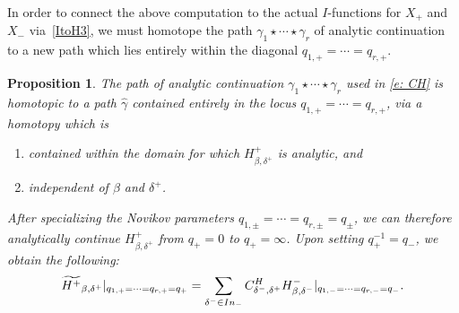 \documentclass[11pt]{article}
\numberwithin{equation}{section}
\newtheorem{Proposition}[Theorem]{Proposition}
 { \theoremstyle{definition}
\newtheorem{Definition}[Theorem]{Definition}
\newtheorem{Note}[Theorem]{Note}
\newtheorem{Example}[Theorem]{Example}
\newtheorem{Remark}[Theorem]{Remark} }
\numberwithin{equation}{section}
\begin{document}
In order to connect the above computation to the actual $I$-functions for $X_+$ and $X_-$ via~\eqref{ItoH3}, we must homotope the path $\gamma_1 \star \cdots \star \gamma_r$ of analytic continuation to a new path which lies entirely within the diagonal $q_{1, +} = \cdots =q_{r, +}$.
\begin{Proposition}\label{p:ancon}
The path of analytic continuation $\gamma_1 \star \cdots \star \gamma_r$ used in \eqref{e: CH} is homotopic to a path $\hat \gamma$ contained entirely in the locus $q_{1, +} = \cdots = q_{r, +}$, via a homotopy which is
\begin{enumerate}\itemsep=0pt
\item[$1)$] contained within the domain for which ${H^{+}_{\beta, \delta^+}}$ is analytic, and
\item[$2)$] independent of $\beta$ and $\delta^+$.
\end{enumerate}
After specializing the Novikov parameters $q_{1, \pm} = \cdots = q_{r, \pm} = q_\pm$, we can therefore analytically continue $H^{+}_{\beta, \delta^+}$ from $q_+ = 0$ to $q_+ = \infty$. Upon setting $q_+^{-1} = q_-$, we obtain the following:
\begin{equation}\label{e: CHspecial} \widetilde{H^{+}}_{\beta, \delta^+}|_{q_{1, +} = \cdots =q_{r, +} = q_+} = \sum_{\delta^- \in {\rm In}_-} C^H_{\delta^-, \delta^+} H^{-}_{\beta, \delta^-}|_{q_{1, -} = \cdots = q_{r, -} = q_-}.\end{equation}
\end{Proposition}
\end{document}
